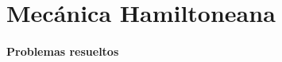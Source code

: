 \documentclass[/home/hernan-barquero/Documents/Apuntes_mecanica_teorica/main.tex]{subfiles}
\begin{document}
    \part{Mecánica Hamiltoneana}

    \subsection{Problemas resueltos}
    
\end{document}
